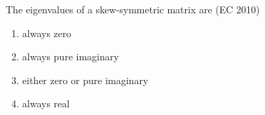 \item The eigenvalues of a skew-symmetric matrix are
	\hfill (EC 2010)
\begin{multicols}{2}
\begin{enumerate}
\item always zero
\item always pure imaginary
\item either zero or pure imaginary
\item always real
\end{enumerate}
\end{multicols}

